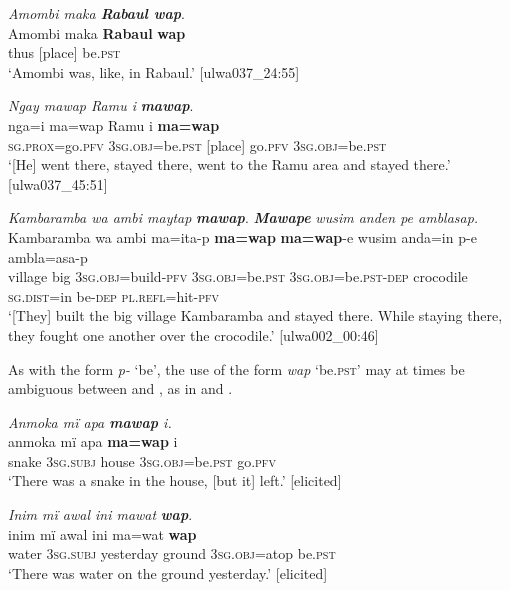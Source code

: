 \ea%
    \label{ex:pred:44}
          \textit{Amombi maka \textbf{Rabaul wap}}.\\
\gll Amombi  maka  \textbf{Rabaul}  \textbf{wap}\\
    [name]    thus  [place]    be.\textsc{pst}\\
\glt `Amombi was, like, in Rabaul.’ [ulwa037\_24:55]
\z

\ea%
    \label{ex:pred:45}
          \textit{Ngay mawap Ramu i} \textbf{\textit{mawap}}.\\
\gll nga=i        ma=wap      Ramu  i    \textbf{ma=wap}\\
    \textsc{sg.prox}=go.\textsc{pfv}  3\textsc{sg.obj}=be.\textsc{pst}  [place]  go.\textsc{pfv}  3\textsc{sg.obj}=be.\textsc{pst}\\
\glt `[He] went there, stayed there, went to the Ramu area and stayed there.’ [ulwa037\_45:51]
\z

\ea%
    \label{ex:pred:46}
          \textit{Kambaramba wa ambi maytap} \textbf{\textit{mawap}}. \textbf{\textit{Mawape}} \textit{wusim anden pe amblasap.}\\
\gll    Kambaramba  wa    ambi  ma=ita-p        \textbf{ma=wap}     \textbf{ma=wap}{}-e      wusim    anda=in    p-e ambla=asa-p\\
    [place]      village  big    3\textsc{sg.obj}=build-\textsc{pfv}  3\textsc{sg.obj}=be.\textsc{pst}    3\textsc{sg.obj}=be.\textsc{pst-dep}  crocodile  \textsc{sg.dist}=in    be\textsc{{}-dep}    \textsc{pl.refl}=hit-\textsc{pfv}\\
\glt `[They] built the big village Kambaramba and stayed there. While staying there, they fought one another over the crocodile.’ [ulwa002\_00:46]
\z

As with the form \textit{p-} ‘be’, the use of the form \textit{wap} ‘be.\textsc{pst}’ may at times be ambiguous between  and , as in  and .

\ea%
    \label{ex:pred:47}
          \textit{Anmoka mï apa \textbf{mawap} i.}\\
\gll    anmoka  mï      apa    \textbf{ma=wap}      i\\
    snake    3\textsc{sg.subj}  house  3\textsc{sg.obj}=be.\textsc{pst}  go.\textsc{pfv}\\
\glt `There was a snake in the house, [but it] left.’ [elicited]
\z

\ea%
    \label{ex:pred:48}
          \textit{Inim mï awal ini mawat} \textbf{\textit{wap}}.\\
\gll inim  mï      awal    ini    ma=wat    \textbf{wap}\\
    water  3\textsc{sg.subj}  yesterday  ground  3\textsc{sg.obj}=atop  be.\textsc{pst}\\
\glt `There was water on the ground yesterday.’ [elicited]
\z

